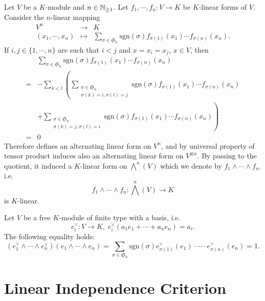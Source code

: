 \begin{exampleenv}
    Let $V$ be a $K$-module and $n\in \mathbb{N}_{\ge 1}$.
    Let $f_1,\cdots,f_n : V \rightarrow K$ be $K$-linear forms of $V$.
    Consider the $n$-linear mapping
    $$\begin{array}{rcl}
        V^n & \longrightarrow & K\\
        (x_1,\cdots,x_n) & \longmapsto & \displaystyle\sum_{\sigma \in \mathfrak{S}_n} \mathrm{sgn}(\sigma) f_{\sigma(1)}(x_1) \cdots f_{\sigma(n)}(x_n).
    \end{array}$$
    If $i,j \in \{1,\cdots,n\}$ are such that $i<j$ and $x = x_i = x_j$, $x\in V$, then
    $$\begin{aligned}
        & \displaystyle\sum_{\sigma \in \mathfrak{S}_n} \mathrm{sgn}(\sigma) f_{\sigma(1)}(x_1) \cdots f_{\sigma(n)}(x_n)\\
        =& - \displaystyle\sum_{k<l} \left(\sum_{\substack{\sigma \in \mathfrak{S}_n\\ \sigma(k) = i, \sigma(l) = j}} \mathrm{sgn}(\sigma) f_{\sigma(1)}(x_1) \cdots f_{\sigma(n)}(x_n)\right. \\
        & \left.+ \sum_{\substack{\sigma \in \mathfrak{S}_n\\ \sigma(k) = j, \sigma(l) = i}} \mathrm{sgn}(\sigma) f_{\sigma(1)}(x_1) \cdots f_{\sigma(n)}(x_n)\right)\\
        =& 0
    \end{aligned}$$
    Therefore defines an alternating linear form on $V^n$, and by universal property of tensor product induces also an alternating linear form on $V^{\otimes n}$.
    By passing to the quotient, it induced a $K$-linear form on $\bigwedge^n (V)$ which we denote by $f_1 \wedge \cdots \wedge f_n$. i.e.
    $$ f_1 \wedge \cdots \wedge f_n : \bigwedge^n (V) \rightarrow K$$
    is $K$-linear.
    
    \quad Let $V$ be a free $K$-module of finite type with a basis, i.e.
    $$ e_{i}^\vee : V\rightarrow K,\; e_{i}^\vee(a_1 e_1 + \cdots + a_n e_n) = a_i.$$
    The following equality holds:
    $$ \left(e_1^\vee \wedge \cdots \wedge e_n^\vee\right) \left(e_1 \wedge \cdots \wedge e_n\right) = \sum_{\sigma \in \mathfrak{S}_n}\mathrm{sgn}(\sigma)e_{\sigma(1)}^\vee(e_1) \cdot \cdots \cdot e_{\sigma(n)}^\vee(e_n) = 1.$$
\end{exampleenv}


\section{Linear Independence Criterion}

